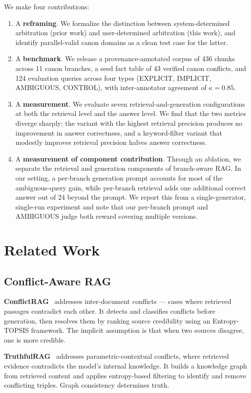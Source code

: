 \documentclass[conference]{IEEEtran}
\begin{document}
We make four contributions:
\begin{enumerate}
\item A \textbf{reframing}. We formalize the distinction between system-determined arbitration (prior work) and user-determined arbitration (this work), and identify parallel-valid canon domains as a clean test case for the latter.
\item A \textbf{benchmark}. We release a provenance-annotated corpus of 436 chunks across 11 canon branches, a seed fact table of 43 verified canon conflicts, and 124 evaluation queries across four types (EXPLICIT, IMPLICIT, AMBIGUOUS, CONTROL), with inter-annotator agreement of $\kappa = 0.85$.
\item A \textbf{measurement}. We evaluate seven retrieval-and-generation configurations at both the retrieval level and the answer level. We find that the two metrics diverge sharply: the variant with the highest retrieval precision produces no improvement in answer correctness, and a keyword-filter variant that modestly improves retrieval precision halves answer correctness.
\item A \textbf{measurement of component contribution}. Through an ablation, we separate the retrieval and generation components of branch-aware RAG. In our setting, a per-branch generation prompt accounts for most of the ambiguous-query gain, while per-branch retrieval adds one additional correct answer out of 24 beyond the prompt. We report this from a single-generator, single-run experiment and note that our per-branch prompt and AMBIGUOUS judge both reward covering multiple versions.
\end{enumerate}

\section{Related Work}

\subsection{Conflict-Aware RAG}

\textbf{ConflictRAG}~\cite{conflictrag} addresses inter-document conflicts --- cases where retrieved passages contradict each other. It detects and classifies conflicts before generation, then resolves them by ranking source credibility using an Entropy-TOPSIS framework. The implicit assumption is that when two sources disagree, one is more credible.

\textbf{TruthfulRAG}~\cite{truthfulrag} addresses parametric-contextual conflicts, where retrieved evidence contradicts the model's internal knowledge. It builds a knowledge graph from retrieved content and applies entropy-based filtering to identify and remove conflicting triples. Graph consistency determines truth.
\end{document}
